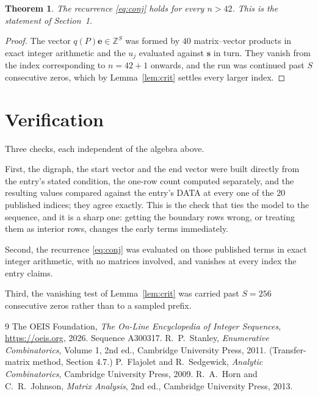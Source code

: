 \documentclass[11pt,a4paper]{article}
\theoremstyle{plain}
\newtheorem{theorem}{Theorem}
\theoremstyle{definition}
\begin{document}
\begin{theorem}
The recurrence \eqref{eq:conj} holds for every $n>42$. This is the statement of
Section~1.
\end{theorem}

\begin{proof}
The vector $q(P)\mathbf{e}\in\mathbb{Z}^{S}$ was formed by $40$ matrix--vector
products in exact integer arithmetic and the $u_j$ evaluated against $\mathbf{s}$ in turn.
They vanish from the index corresponding to $n=42+1$ onwards, and the run was continued
past $S$ consecutive zeros, which by Lemma~\ref{lem:crit} settles every larger index.
\end{proof}

\section{Verification}

Three checks, each independent of the algebra above.

First, the digraph, the start vector and the end vector were built directly from the
entry's stated condition, the one-row count computed separately, and the resulting values
compared against the entry's DATA at every one of the $20$ published indices; they
agree exactly. This is the check that ties the model to the sequence, and it is a sharp one:
getting the boundary rows wrong, or treating them as interior rows, changes the early terms
immediately.

Second, the recurrence \eqref{eq:conj} was evaluated on those published terms in exact
integer arithmetic, with no matrices involved, and vanishes at every index the entry claims.

Third, the vanishing test of Lemma~\ref{lem:crit} was carried past $S=256$ consecutive
zeros rather than to a sampled prefix.

\begin{thebibliography}{9}
 The OEIS Foundation, \emph{The On-Line Encyclopedia of Integer
Sequences}, \url{https://oeis.org}, 2026. Sequence A300317.
 R.~P.~Stanley, \emph{Enumerative Combinatorics}, Volume 1, 2nd ed.,
Cambridge University Press, 2011. (Transfer-matrix method, Section 4.7.)
 P.~Flajolet and R.~Sedgewick, \emph{Analytic Combinatorics}, Cambridge
University Press, 2009.
 R.~A.~Horn and C.~R.~Johnson, \emph{Matrix Analysis}, 2nd ed., Cambridge
University Press, 2013.
\end{thebibliography}
\end{document}
